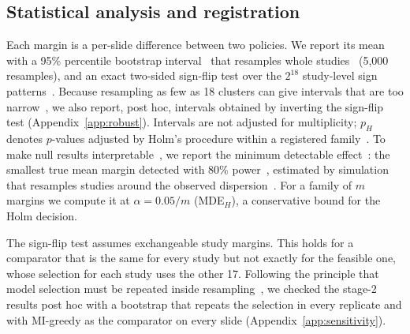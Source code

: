 \documentclass[10pt]{article}
\begin{document}
\subsection{Statistical analysis and registration}
Each margin is a per-slide difference between two policies. We report its mean with a 95\% percentile bootstrap
interval~\citep{efron1993introduction} that resamples whole studies~\citep{field2007bootstrapping} (5{,}000
resamples), and an exact two-sided sign-flip test over the $2^{18}$ study-level sign
patterns~\citep{winkler2014permutation}. Because resampling as few as 18 clusters can give intervals that are too
narrow~\citep{cameron2008bootstrap}, we also report, post hoc, intervals obtained by inverting the sign-flip test
(Appendix~\ref{app:robust}). Intervals are not adjusted for multiplicity; $p_H$ denotes $p$-values
adjusted by Holm's procedure within a registered family~\citep{holm1979simple}. To make null results
interpretable~\citep{altman1995absence}, we report the minimum detectable effect~\citep{bloom1995minimum}: the
smallest true mean margin detected with 80\% power~\citep{cohen1988statistical}, estimated by simulation that
resamples studies around the observed dispersion~\citep{arnold2011simulation}. For a family of $m$ margins we
compute it at $\alpha=0.05/m$ (MDE$_H$), a conservative bound for the Holm decision.

The sign-flip test assumes exchangeable study margins. This holds for a comparator that is the same for every study but not exactly for the
feasible one, whose selection for each study uses the other 17. Following the principle that model selection must
be repeated inside resampling~\citep{varma2006bias}, we checked the stage-2 results post hoc with a bootstrap that
repeats the selection in every replicate and with MI-greedy as the comparator on every slide
(Appendix~\ref{app:sensitivity}).
\end{document}

